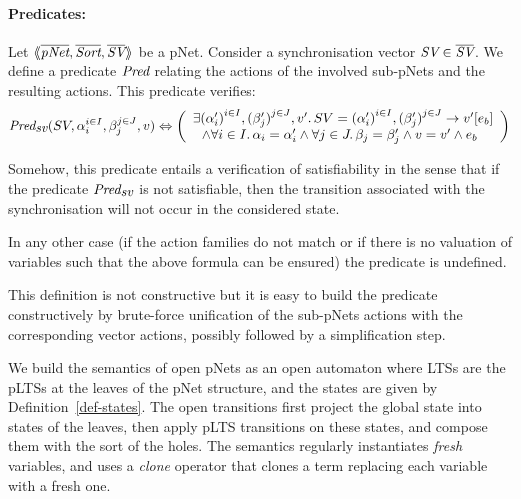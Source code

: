 \documentclass{lncs/llncs}
\begin{document}
\paragraph{Predicates:}
Let
$\mylangle\overline{\pNet},\overline{\Sort},\overline{\symb{SV}}\myrangle$
be a pNet. Consider a synchronisation vector $\symb{SV}\in \overline{\symb{SV}}$. We 
define a
predicate $\Pred$ relating
the actions of the involved sub-pNets and the resulting actions. This predicate verifies:
\[\Pred_{\symb{sv}}(SV, \alpha_i^{i\in I}, \beta_j^{j\in J}, v)\Leftrightarrow \bigg(
\begin{array}{l}
\exists {(\alpha'_i)}^{i\in I},
{(\beta'_j)}^{j\in J},v'.\, SV=\SV{{(\alpha'_i)}^{i\in I}, {(\beta'_j)}^{j\in J}} {v'} 
{e_b}
\\~~\land
\forall i\in I.\, \alpha_i=\alpha'_i\land \forall j \in J.\, \beta_j=\beta'_j \land v=v' 
\land e_b
\end{array} \bigg)\]

Somehow, this predicate entails a verification of satisfiability in the sense that if the 
predicate $\Pred_{\symb{sv}}$ is not satisfiable, then the transition associated with the 
synchronisation will not occur in the considered state. 


In any other case (if the action families do not match or if there is no valuation of
variables such that the above formula can be ensured) the predicate is undefined.

This definition is not constructive but it is easy to build the predicate constructively
by brute-force unification of the sub-pNets
actions with the corresponding vector actions, possibly followed by a simplification
step.


We build the semantics of open pNets as an open automaton where LTSs are the pLTSs at
the leaves of the pNet structure, and the states are given by 
Definition~\ref{def-states}. The open transitions first
 project the global state into states of the leaves, then apply
pLTS transitions on these states, and compose them with the sort of the holes. %
The semantics   regularly instantiates \emph{fresh} variables, and uses a
\emph{clone} operator that clones a term replacing each variable with a
fresh one.
\end{document}
